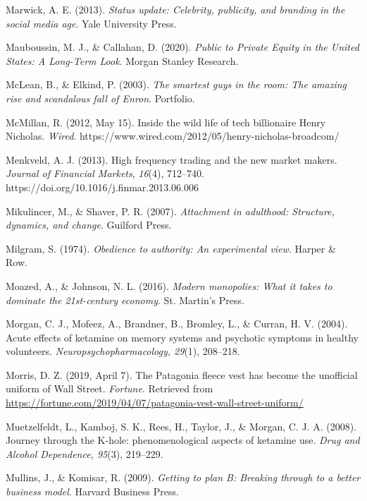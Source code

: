 \begin{thebibliography}{}
    Marwick, A. E. (2013). \textit{Status update: Celebrity, publicity, and branding in the social media age}. Yale University Press.

    Mauboussin, M. J., \& Callahan, D. (2020). \textit{Public to Private Equity in the United States: A Long-Term Look}. Morgan Stanley Research.

    McLean, B., \& Elkind, P. (2003). \textit{The smartest guys in the room: The amazing rise and scandalous fall of Enron}. Portfolio.

    McMillan, R. (2012, May 15). Inside the wild life of tech billionaire Henry Nicholas. \textit{Wired}. https://www.wired.com/2012/05/henry-nicholas-broadcom/

    Menkveld, A. J. (2013). High frequency trading and the new market makers. \textit{Journal of Financial Markets}, \textit{16}(4), 712–740. https://doi.org/10.1016/j.finmar.2013.06.006

    Mikulincer, M., \& Shaver, P. R. (2007). \textit{Attachment in adulthood: Structure, dynamics, and change}. Guilford Press.

    Milgram, S. (1974). \textit{Obedience to authority: An experimental view}. Harper \& Row.

    Moazed, A., \& Johnson, N. L. (2016). \textit{Modern monopolies: What it takes to dominate the 21st-century economy}. St. Martin’s Press.

    Morgan, C. J., Mofeez, A., Brandner, B., Bromley, L., \& Curran, H. V. (2004). Acute effects of ketamine on memory systems and psychotic symptoms in healthy volunteers. \textit{Neuropsychopharmacology, 29}(1), 208–218.

    Morris, D. Z. (2019, April 7). The Patagonia fleece vest has become the unofficial uniform of Wall Street. \textit{Fortune}. Retrieved from \url{https://fortune.com/2019/04/07/patagonia-vest-wall-street-uniform/}

    Muetzelfeldt, L., Kamboj, S. K., Rees, H., Taylor, J., \& Morgan, C. J. A. (2008). Journey through the K-hole: phenomenological aspects of ketamine use. \textit{Drug and Alcohol Dependence, 95}(3), 219–229.

    Mullins, J., \& Komisar, R. (2009). \textit{Getting to plan B: Breaking through to a better business model}. Harvard Business Press.


\end{thebibliography}
